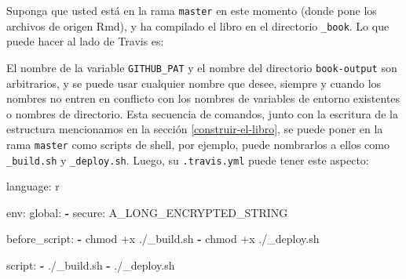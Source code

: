 \documentclass[12pt,]{krantz}
\makeatletter
\newenvironment{Shaded}{\begin{snugshade}}{\end{snugshade}}
\newcommand{\KeywordTok}[1]{\textcolor[rgb]{0.13,0.29,0.53}{\textbf{#1}}}
\newcommand{\StringTok}[1]{\textcolor[rgb]{0.31,0.60,0.02}{#1}}
\newcommand{\CommentTok}[1]{\textcolor[rgb]{0.56,0.35,0.01}{\textit{#1}}}
\newcommand{\FunctionTok}[1]{\textcolor[rgb]{0.00,0.00,0.00}{#1}}
\newcommand{\VariableTok}[1]{\textcolor[rgb]{0.00,0.00,0.00}{#1}}
\newcommand{\BuiltInTok}[1]{#1}
\newcommand{\AttributeTok}[1]{\textcolor[rgb]{0.77,0.63,0.00}{#1}}
\newcommand{\NormalTok}[1]{#1}
\newenvironment{kframe}{%
\medskip{}
\setlength{\fboxsep}{.8em}
 \def\at@end@of@kframe{}%
 \ifinner\ifhmode%
  \def\at@end@of@kframe{\end{minipage}}%
  \begin{minipage}{\columnwidth}%
 \fi\fi%
 \def\FrameCommand##1{\hskip\@totalleftmargin \hskip-\fboxsep
 \colorbox{shadecolor}{##1}\hskip-\fboxsep
     \hskip-\linewidth \hskip-\@totalleftmargin \hskip\columnwidth}%
 \MakeFramed {\advance\hsize-\width
   \@totalleftmargin\z@ \linewidth\hsize
   \@setminipage}}%
 {\par\unskip\endMakeFramed%
 \at@end@of@kframe}
\renewenvironment{Shaded}{\begin{kframe}}{\end{kframe}}
\theoremstyle{definition}
\theoremstyle{definition}
\theoremstyle{definition}
\theoremstyle{remark}
\makeatother
\begin{document}
Suponga que usted está en la rama \texttt{master} en este momento (donde
pone los archivos de origen Rmd), y ha compilado el libro en el
directorio \texttt{\_book}. Lo que puede hacer al lado de Travis es:

\begin{Shaded}
\end{Shaded}

El nombre de la variable \texttt{GITHUB\_PAT} y el nombre del directorio
\texttt{book-output} son arbitrarios, y se puede usar cualquier nombre
que desee, siempre y cuando los nombres no entren en conflicto con los
nombres de variables de entorno existentes o nombres de directorio. Esta
secuencia de comandos, junto con la escritura de la estructura
mencionamos en la sección \ref{construir-el-libro}, se puede poner en la
rama \texttt{master} como scripts de shell, por ejemplo, puede
nombrarlos a ellos como \texttt{\_build.sh} y \texttt{\_deploy.sh}.
Luego, su \texttt{.travis.yml} puede tener este aspecto:

\begin{Shaded}
\begin{Highlighting}[]
\FunctionTok{language:}\AttributeTok{ r}

\FunctionTok{env:}
  \FunctionTok{global:}
    \KeywordTok{-} \FunctionTok{secure:}\AttributeTok{ A_LONG_ENCRYPTED_STRING}

\FunctionTok{before_script:}
  \KeywordTok{-}\NormalTok{ chmod +x ./_build.sh}
  \KeywordTok{-}\NormalTok{ chmod +x ./_deploy.sh}

\FunctionTok{script:}
  \KeywordTok{-}\NormalTok{ ./_build.sh}
  \KeywordTok{-}\NormalTok{ ./_deploy.sh}
\end{Highlighting}
\end{Shaded}
\end{document}
